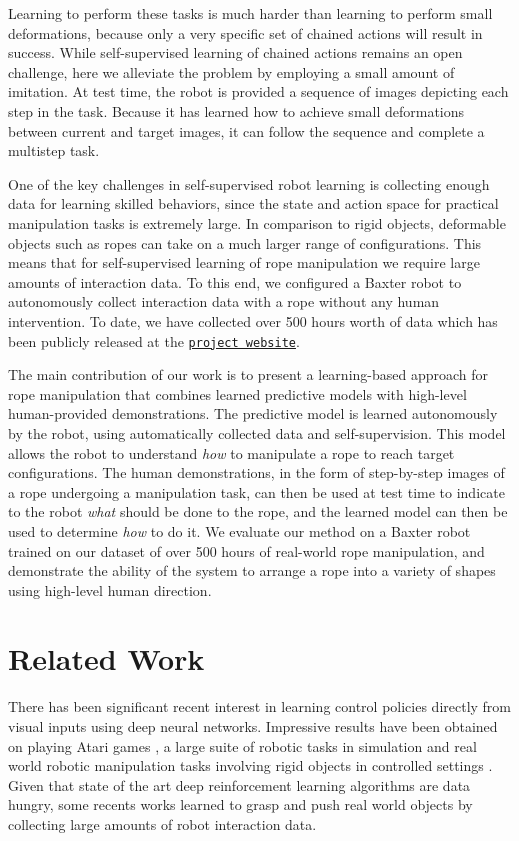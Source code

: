 \documentclass[letterpaper, 10 pt, conference]{ieeeconf}  %
\begin{document}
Learning to perform these tasks is much harder than learning to perform small deformations, because only a very specific set of chained actions will result in success. While self-supervised learning of chained actions remains an open challenge, here we alleviate the problem by employing a small amount of imitation. At test time, the robot is provided a sequence of images depicting each step in the task. Because it has learned how to achieve small deformations between current and target images, it can follow the sequence and complete a multistep task.

One of the key challenges in self-supervised robot learning is collecting enough data for learning skilled behaviors, since the state and action space for practical manipulation tasks is extremely large. In comparison to rigid objects, deformable objects such as ropes can take on a much larger range of configurations. This means that for self-supervised learning of rope manipulation we require large amounts of interaction data. To this end, we configured a Baxter robot to autonomously collect interaction data with a rope without any human intervention. To date, we have collected over 500 hours worth of data which has been publicly released at the \href{https://ropemanipulation.github.io/}{\texttt{project website}}.

The main contribution of our work is to present a learning-based approach for rope manipulation that combines learned predictive models with high-level human-provided demonstrations. The predictive model is learned autonomously by the robot, using automatically collected data and self-supervision. This model allows the robot to understand \emph{how} to manipulate a rope to reach target configurations. The human demonstrations, in the form of step-by-step images of a rope undergoing a manipulation task, can then be used at test time to indicate to the robot \emph{what} should be done to the rope, and the learned model can then be used to determine \emph{how} to do it. We evaluate our method on a Baxter robot trained on our dataset of over 500 hours of real-world rope manipulation, and demonstrate the ability of the system to arrange a rope into a variety of shapes using high-level human direction.

\section{Related Work}
There has been significant recent interest in learning control policies directly from visual inputs using deep neural networks. Impressive results have been obtained on playing Atari games \cite{mnih2015human}, a large suite of robotic tasks in simulation \cite{lillicrap2015continuous,mnih2016asynchronous,billiards,wahlstrom2015from,watter2015embed,actionconditioned} and real world robotic manipulation tasks involving rigid objects in controlled settings \cite{LevineFDA15,lenz2015deepMPC}.
Given that state of the art deep reinforcement learning algorithms are data hungry, some recents works learned to grasp \cite{pinto2015supersizing,levine2016learning} and push \cite{agrawal2016poking} real world objects by collecting large amounts of robot interaction data. 
\end{document}

